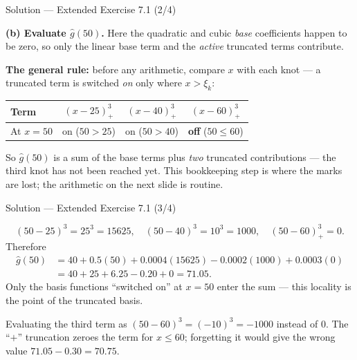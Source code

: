 \documentclass[aspectratio=169,11pt]{beamer}
\begin{document}
\begin{frame}{Solution --- Extended Exercise 7.1 (2/4)}
\begin{solutionbox}
\textbf{(b) Evaluate $\hat g(50)$.} Here the quadratic and cubic \emph{base} coefficients happen to be zero, so only the linear base term and the \emph{active} truncated terms contribute.

\medskip
\textbf{The general rule:} before any arithmetic, compare $x$ with each knot --- a truncated term is switched \emph{on} only where $x>\xi_k$:
\begin{center}\footnotesize
\begin{tabular}{lccc}
\toprule
Term & $(x-25)^3_+$ & $(x-40)^3_+$ & $(x-60)^3_+$ \\
\midrule
At $x=50$ & on ($50>25$) & on ($50>40$) & \textbf{off} ($50\le 60$) \\
\bottomrule
\end{tabular}
\end{center}
So $\hat g(50)$ is a sum of the base terms plus \emph{two} truncated contributions --- the third knot has not been reached yet. This bookkeeping step is where the marks are lost; the arithmetic on the next slide is routine.
\end{solutionbox}
\end{frame}

\begin{frame}{Solution --- Extended Exercise 7.1 (3/4)}
\begin{solutionbox}
\[ (50-25)^3=25^3=15625,\quad (50-40)^3=10^3=1000,\quad (50-60)^3_+=0. \]
Therefore
\begin{align*}
\hat g(50)&=40+0.5(50)+0.0004(15625)-0.0002(1000)+0.0003(0)\\
&=40+25+6.25-0.20+0 = \mathbf{71.05}.
\end{align*}
Only the basis functions ``switched on'' at $x=50$ enter the sum --- this locality is the point of the truncated basis.
\end{solutionbox}
\begin{mistake}
Evaluating the third term as $(50-60)^3=(-10)^3=-1000$ instead of $0$. The ``$+$'' truncation zeroes the term for $x\le 60$; forgetting it would give the wrong value $71.05-0.30=70.75$.
\end{mistake}
\end{frame}
\end{document}
